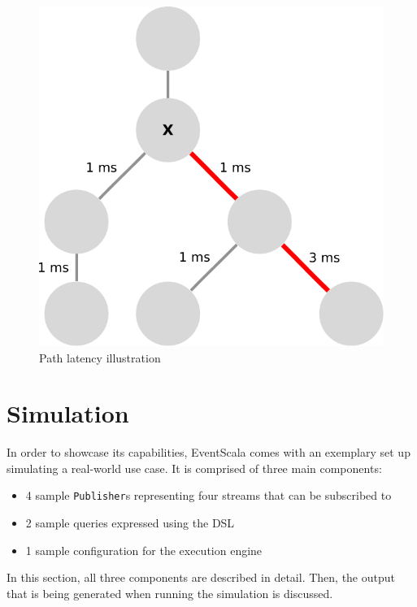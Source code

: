 \documentclass[article, 10pt, type=bsc, colorback, accentcolor=tud8b, parskip=half, bibliography=totocnumbered]{tudthesis}
\begin{document}
\begin{figure}
\caption{Path latency illustration}
\label{fig:latency}
\includegraphics[scale=0.7]{images/latency.pdf}
\centering
\end{figure}

\newpage

\section{Simulation}
\label{sec:simulation}

In order to showcase its capabilities, EventScala comes with an exemplary set up simulating a real-world use case.
It is comprised of three main components:

\begin{itemize}
\item
4 sample \lstinline{Publisher}s representing four streams that can be subscribed to
\item
2 sample queries expressed using the DSL
\item
1 sample configuration for the execution engine
\end{itemize}

In this section, all three components are described in detail.
Then, the output that is being generated when running the simulation is discussed.
\end{document}
